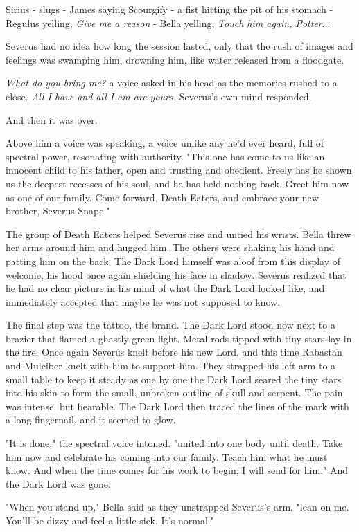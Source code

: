\documentclass[a4paper,11pt]{article}
\begin{document}
Sirius - slugs - James saying Scourgify - a fist hitting the pit of his stomach - Regulus yelling, \emph{Give me a reason} - Bella yelling, \emph{Touch him again, Potter}...

Severus had no idea how long the session lasted, only that the rush of images and feelings was swamping him, drowning him, like water released from a floodgate.

\emph{What do you bring me?} a voice asked in his head as the memories rushed to a close. \emph{All I have and all I am are yours.} Severus's own mind responded.

And then it was over.

Above him a voice was speaking, a voice unlike any he'd ever heard, full of spectral power, resonating with authority. "This one has come to us like an innocent child to his father, open and trusting and obedient. Freely has he shown us the deepest recesses of his soul, and he has held nothing back. Greet him now as one of our family. Come forward, Death Eaters, and embrace your new brother, Severus Snape."

The group of Death Eaters helped Severus rise and untied his wrists. Bella threw her arms around him and hugged him. The others were shaking his hand and patting him on the back. The Dark Lord himself was aloof from this display of welcome, his hood once again shielding his face in shadow. Severus realized that he had no clear picture in his mind of what the Dark Lord looked like, and immediately accepted that maybe he was not supposed to know.

The final step was the tattoo, the brand. The Dark Lord stood now next to a brazier that flamed a ghastly green light. Metal rods tipped with tiny stars lay in the fire. Once again Severus knelt before his new Lord, and this time Rabastan and Mulciber knelt with him to support him. They strapped his left arm to a small table to keep it steady as one by one the Dark Lord seared the tiny stars into his skin to form the small, unbroken outline of skull and serpent. The pain was intense, but bearable. The Dark Lord then traced the lines of the mark with a long fingernail, and it seemed to glow.

"It is done," the spectral voice intoned. "united into one body until death. Take him now and celebrate his coming into our family. Teach him what he must know. And when the time comes for his work to begin, I will send for him." And the Dark Lord was gone.

"When you stand up," Bella said as they unstrapped Severus's arm, "lean on me. You'll be dizzy and feel a little sick. It's normal."
\end{document}
